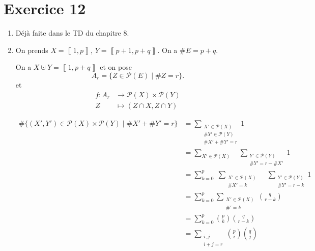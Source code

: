 \part{Exercice 12}

\begin{enumerate}
	\item Déjà faite dans le TD du chapitre 8.
	\item On prends $X = \left\llbracket 1,p \right\rrbracket$, $Y = \left\llbracket p+1, p+q \right\rrbracket$. On a $\#E = p + q$.

		On a $X \cupdot Y = \left\llbracket 1, p+q \right\rrbracket$ et on pose \[
			A_r = \{Z \in \mathcal{P}(E) \mid \#Z = r\}.
		\] et \begin{align*}
			f: A_r &\longrightarrow \mathcal{P}(X) \times \mathcal{P}(Y) \\
			Z &\longmapsto (Z\cap X, Z\cap Y)
		\end{align*}

		\begin{align*}
			\#\big\{ (X', Y') \in \mathcal{P}(X) \times \mathcal{P}(Y)  \mid \#X' + \#Y' = r \big\}
			&= \sum_{\substack{X' \in \mathcal{P}(X)\\ \#Y' \in \mathcal{P}(Y)\\\#X' + \#Y' = r}} 1 \\
			&= \sum_{X' \in \mathcal{P}(X)} \quad \sum_{\substack{Y' \in \mathcal{P}(Y)\\\#Y' = r - \#X'}} 1\\
			&= \sum_{k=0}^{p}\;\sum_{\substack{X' \in \mathcal{P}(X)\\ \#X' = k}} \quad \sum_{\substack{Y' \in \mathcal{P}(Y)\\ \#Y' = r - k}} 1\\
			&= \sum_{k=0}^p \sum_{\substack{X' \in \mathcal{P}(X)\\ \#' = k}} {q \choose r - k} \\
			&= \sum_{k=0}^p {p\choose k}{q \choose r - k} \\
			&= \sum_{\substack{i,j\\i + j = r}} {p\choose i}{q \choose j} \\
		\end{align*}
\end{enumerate}
